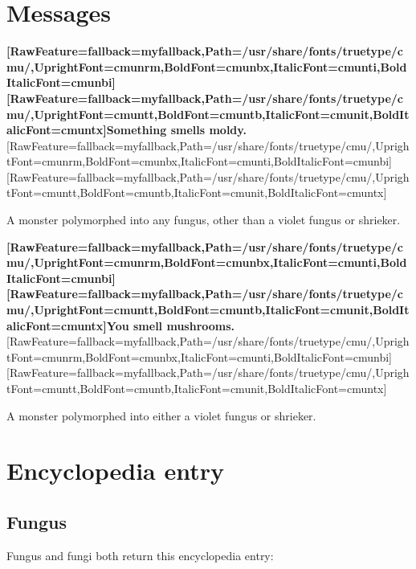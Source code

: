 \section{Messages}
{\bfseries \allowbreak{}\setmainfont{cmunbx.ttf}[RawFeature={fallback=myfallback},Path=/usr/share/fonts/truetype/cmu/,UprightFont=cmunrm,BoldFont=cmunbx,ItalicFont=cmunti,BoldItalicFont=cmunbi]\setmonofont{cmunbx.ttf}[RawFeature={fallback=myfallback},Path=/usr/share/fonts/truetype/cmu/,UprightFont=cmuntt,BoldFont=cmuntb,ItalicFont=cmunit,BoldItalicFont=cmuntx]\bfseries Something smells moldy.}\allowbreak{}\setmainfont{cmunrm.ttf}[RawFeature={fallback=myfallback},Path=/usr/share/fonts/truetype/cmu/,UprightFont=cmunrm,BoldFont=cmunbx,ItalicFont=cmunti,BoldItalicFont=cmunbi]\setmonofont{cmunrm.ttf}[RawFeature={fallback=myfallback},Path=/usr/share/fonts/truetype/cmu/,UprightFont=cmuntt,BoldFont=cmuntb,ItalicFont=cmunit,BoldItalicFont=cmuntx]

\begin{myquote}
\item{}A monster polymorphed into any fungus, other than a violet fungus or shrieker.
\end{myquote}

{\bfseries \allowbreak{}\setmainfont{cmunbx.ttf}[RawFeature={fallback=myfallback},Path=/usr/share/fonts/truetype/cmu/,UprightFont=cmunrm,BoldFont=cmunbx,ItalicFont=cmunti,BoldItalicFont=cmunbi]\setmonofont{cmunbx.ttf}[RawFeature={fallback=myfallback},Path=/usr/share/fonts/truetype/cmu/,UprightFont=cmuntt,BoldFont=cmuntb,ItalicFont=cmunit,BoldItalicFont=cmuntx]\bfseries You smell mushrooms.}\allowbreak{}\setmainfont{cmunrm.ttf}[RawFeature={fallback=myfallback},Path=/usr/share/fonts/truetype/cmu/,UprightFont=cmunrm,BoldFont=cmunbx,ItalicFont=cmunti,BoldItalicFont=cmunbi]\setmonofont{cmunrm.ttf}[RawFeature={fallback=myfallback},Path=/usr/share/fonts/truetype/cmu/,UprightFont=cmuntt,BoldFont=cmuntb,ItalicFont=cmunit,BoldItalicFont=cmuntx]

\begin{myquote}
\item{}A monster polymorphed into either a violet fungus or shrieker.
\end{myquote}

\section{Encyclopedia entry}
\label{20}
\subsection{Fungus}
\label{21}
Fungus and fungi both return this encyclopedia\footnotemark[153] entry:

